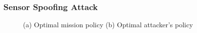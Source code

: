 \documentclass[letterpaper, 10 pt, conference]{ieeeconf}  %
\begin{document}
\subsubsection{Sensor Spoofing Attack}
\begin{figure}[]
	\centering
	\caption{(a) Optimal mission policy (b) Optimal attacker's policy}
	\label{fig:policies}
\end{figure}
\end{document}
